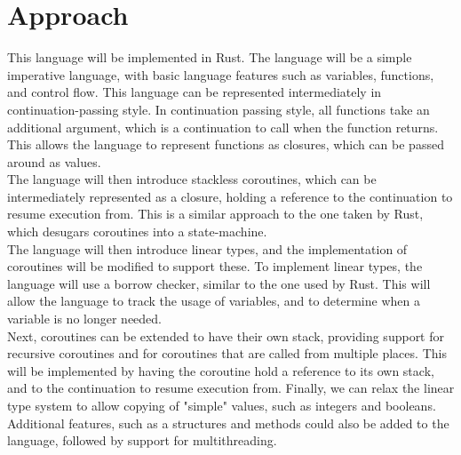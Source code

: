 \documentclass[publish, nobox]{acmconf}
\begin{document}
\section*{Approach}
This language will be implemented in Rust. The language will be a simple imperative language, with basic language features such as variables, functions, and control flow. This language can be represented intermediately in continuation-passing style. In continuation passing style, all functions take an additional argument, which is a continuation to call when the function returns. This allows the language to represent functions as closures, which can be passed around as values. \\
The language will then introduce stackless coroutines, which can be intermediately represented as a closure, holding a reference to the continuation to resume execution from. This is a similar approach to the one taken by Rust, which desugars coroutines into a state-machine. \\
The language will then introduce linear types, and the implementation of coroutines will be modified to support these. To implement linear types, the language will use a borrow checker, similar to the one used by Rust. This will allow the language to track the usage of variables, and to determine when a variable is no longer needed. \\
Next, coroutines can be extended to have their own stack, providing support for recursive coroutines and for coroutines that are called from multiple places. This will be implemented by having the coroutine hold a reference to its own stack, and to the continuation to resume execution from.
\newpage
Finally, we can relax the linear type system to allow copying of "simple" values, such as integers and booleans. Additional features, such as a structures and methods could also be added to the language, followed by support for multithreading.
\end{document}
